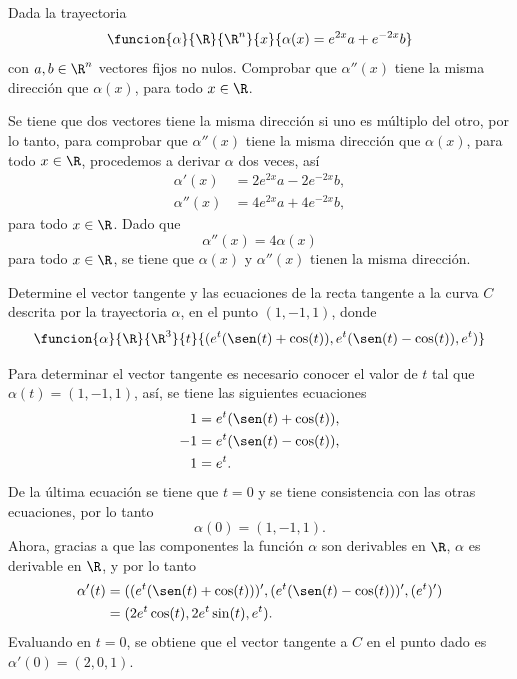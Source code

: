 \documentclass[a4,11pt]{aleph-examen}
\begin{document}
\begin{preguntas}
\item
    Dada la trayectoria
    \[
        \funcion {\alpha}{\R}{\R^n}{x}{\alpha(x)=e^{2x}a+e^{-2x}b}
    \]
    con $a,b \in \R^n$ vectores fijos no nulos. Comprobar que $\alpha''(x)$ tiene la misma dirección que $\alpha(x)$, para todo $x\in\R$.
    
\begin{respuesta}
    Se tiene que dos vectores tiene la misma dirección si uno es múltiplo del otro, por lo tanto, para comprobar que $\alpha''(x)$ tiene la misma dirección que $\alpha(x)$, para todo $x\in\R$, procedemos a derivar $\alpha$ dos veces, así
    \begin{align*}
        \alpha'(x)&=2e^{2x}a-2e^{-2x}b,\\
        \alpha''(x)&=4e^{2x}a+4e^{-2x}b,
    \end{align*}
    para todo $x\in \R$. Dado que
    \[
        \alpha''(x) = 4\alpha(x)
    \]
    para todo $x\in \R$, se tiene que $\alpha(x)$ y $\alpha''(x)$ tienen la misma dirección.
\end{respuesta} 


\item
    Determine el vector tangente y las ecuaciones de la recta tangente a la curva $C$ descrita por la trayectoria $\alpha$, en el punto $(1,-1,1)$, donde
    \[
        \funcion{\alpha}{\R}{\R^3}{t}{(e^t(\sen(t)+\cos(t)),e^t(\sen(t)-\cos(t)),e^t)}
    \]
    
\begin{respuesta}
    Para determinar el vector tangente es necesario conocer el valor de $t$ tal que $\alpha(t)=(1,-1,1)$, así, se tiene las siguientes ecuaciones
    \begin{align*}
        1&= e^t(\sen(t)+\cos(t)),\\
        -1&= e^t(\sen(t)-\cos(t)),\\
        1&= e^t.
    \end{align*}
    De la última ecuación se tiene que $t=0$ y se tiene consistencia con las otras ecuaciones, por lo tanto
    \[
        \alpha(0)=(1,-1,1).
    \]
    Ahora, gracias a que las componentes la función $\alpha$ son derivables en $\R$, $\alpha$ es derivable en $\R$, y por lo tanto
    \begin{align*}
        \alpha'(t)
            & = ((e^t(\sen(t)+\cos(t)))', (e^t(\sen(t)-\cos(t)))', (e^t)') \\
            & = (2e^t\cos(t), 2e^t\sin(t), e^t).
    \end{align*}   
    Evaluando en $t=0$, se obtiene que el vector tangente a $C$ en el punto dado es $\alpha'(0)=(2,0,1)$.


\end{respuesta}
\end{preguntas}
\end{document}
